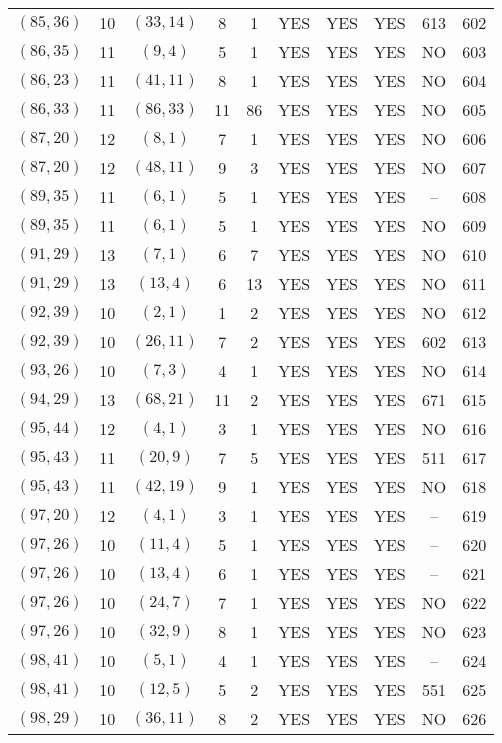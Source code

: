 \begin{longtable}{|c|c|c|c|c|c|c|c|c|c|}
$(85, 36)$ & 10 & $(33, 14)$ & 8 & 1 & YES & YES & YES & 613 & 602\\
$(86, 35)$ & 11 & $(9, 4)$ & 5 & 1 & YES & YES & YES & NO & 603\\
$(86, 23)$ & 11 & $(41, 11)$ & 8 & 1 & YES & YES & YES & NO & 604\\
$(86, 33)$ & 11 & $(86, 33)$ & 11 & 86 & YES & YES & YES & NO & 605\\
$(87, 20)$ & 12 & $(8, 1)$ & 7 & 1 & YES & YES & YES & NO & 606\\
$(87, 20)$ & 12 & $(48, 11)$ & 9 & 3 & YES & YES & YES & NO & 607\\
$(89, 35)$ & 11 & $(6, 1)$ & 5 & 1 & YES & YES & YES & -- & 608\\
$(89, 35)$ & 11 & $(6, 1)$ & 5 & 1 & YES & YES & YES & NO & 609\\
$(91, 29)$ & 13 & $(7, 1)$ & 6 & 7 & YES & YES & YES & NO & 610\\
$(91, 29)$ & 13 & $(13, 4)$ & 6 & 13 & YES & YES & YES & NO & 611\\
$(92, 39)$ & 10 & $(2, 1)$ & 1 & 2 & YES & YES & YES & NO & 612\\
$(92, 39)$ & 10 & $(26, 11)$ & 7 & 2 & YES & YES & YES & 602 & 613\\
$(93, 26)$ & 10 & $(7, 3)$ & 4 & 1 & YES & YES & YES & NO & 614\\
$(94, 29)$ & 13 & $(68, 21)$ & 11 & 2 & YES & YES & YES & 671 & 615\\
$(95, 44)$ & 12 & $(4, 1)$ & 3 & 1 & YES & YES & YES & NO & 616\\
$(95, 43)$ & 11 & $(20, 9)$ & 7 & 5 & YES & YES & YES & 511 & 617\\
$(95, 43)$ & 11 & $(42, 19)$ & 9 & 1 & YES & YES & YES & NO & 618\\
$(97, 20)$ & 12 & $(4, 1)$ & 3 & 1 & YES & YES & YES & -- & 619\\
$(97, 26)$ & 10 & $(11, 4)$ & 5 & 1 & YES & YES & YES & -- & 620\\
$(97, 26)$ & 10 & $(13, 4)$ & 6 & 1 & YES & YES & YES & -- & 621\\
$(97, 26)$ & 10 & $(24, 7)$ & 7 & 1 & YES & YES & YES & NO & 622\\
$(97, 26)$ & 10 & $(32, 9)$ & 8 & 1 & YES & YES & YES & NO & 623\\
$(98, 41)$ & 10 & $(5, 1)$ & 4 & 1 & YES & YES & YES & -- & 624\\
$(98, 41)$ & 10 & $(12, 5)$ & 5 & 2 & YES & YES & YES & 551 & 625\\
$(98, 29)$ & 10 & $(36, 11)$ & 8 & 2 & YES & YES & YES & NO & 626\\

\end{longtable}

